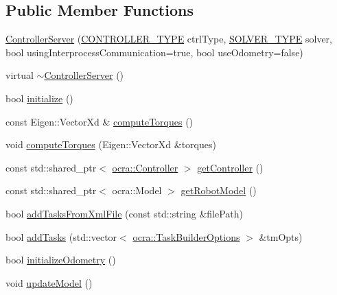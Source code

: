 \subsection*{Public Member Functions}
\begin{DoxyCompactItemize}
\item 
\hyperlink{classocra__recipes_1_1ControllerServer_a78cc49b2b2a3f9daecc0662051b5644d}{Controller\+Server} (\hyperlink{namespaceocra__recipes_ae561cff4ea9a191b8b1ebb4e69a1a4ba}{C\+O\+N\+T\+R\+O\+L\+L\+E\+R\+\_\+\+T\+Y\+PE} ctrl\+Type, \hyperlink{namespaceocra__recipes_afb3bb4de56c2b9472c80d746eb13fed3}{S\+O\+L\+V\+E\+R\+\_\+\+T\+Y\+PE} solver, bool using\+Interprocess\+Communication=true, bool use\+Odometry=false)
\item 
virtual \hyperlink{classocra__recipes_1_1ControllerServer_a02157f0e6432dae6d8ebf3126c335444}{$\sim$\+Controller\+Server} ()
\item 
bool \hyperlink{classocra__recipes_1_1ControllerServer_af51ea42acb8c1adc3db4cc2a256f1f46}{initialize} ()
\item 
const Eigen\+::\+Vector\+Xd \& \hyperlink{classocra__recipes_1_1ControllerServer_a4b4c825748bc85f200f4b82cbffb8e0d}{compute\+Torques} ()
\item 
void \hyperlink{classocra__recipes_1_1ControllerServer_a925d4de1de73f0ac18e50f0f3c4cd0a4}{compute\+Torques} (Eigen\+::\+Vector\+Xd \&torques)
\item 
const std\+::shared\+\_\+ptr$<$ \hyperlink{classocra_1_1Controller}{ocra\+::\+Controller} $>$ \hyperlink{classocra__recipes_1_1ControllerServer_a40bc86b6d9a4140441320c88bfc77652}{get\+Controller} ()
\item 
const std\+::shared\+\_\+ptr$<$ ocra\+::\+Model $>$ \hyperlink{classocra__recipes_1_1ControllerServer_ab83e5cc59e33d26cedbea43afae25e1e}{get\+Robot\+Model} ()
\item 
bool \hyperlink{classocra__recipes_1_1ControllerServer_ad2ca7fafa8c7fff009581df869f65d85}{add\+Tasks\+From\+Xml\+File} (const std\+::string \&file\+Path)
\item 
bool \hyperlink{classocra__recipes_1_1ControllerServer_ad78efdf5d90308b0dc8e88d6d0720c5f}{add\+Tasks} (std\+::vector$<$ \hyperlink{classocra_1_1TaskBuilderOptions}{ocra\+::\+Task\+Builder\+Options} $>$ \&tm\+Opts)
\item 
bool \hyperlink{classocra__recipes_1_1ControllerServer_a441016519ed42fee35c1fd9ae458d874}{initialize\+Odometry} ()
\item 
void \hyperlink{classocra__recipes_1_1ControllerServer_a83755d02be88fa3805d770d964995fb0}{update\+Model} ()
\end{DoxyCompactItemize}
